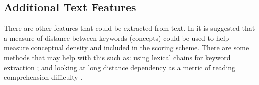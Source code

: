 \documentclass[12pt]{article}
\theoremstyle{grammarstyle}
\begin{document}


\subsection{Additional Text Features}
There are other features that could be extracted from text.
In \citep{robins2010learning} it is suggested that a measure of distance between keywords (concepts) could be used to help measure conceptual density and included in the scoring scheme. There are some methods that may help with this such as: using lexical chains for keyword extraction \citep{ercan2007using}; and looking at long distance dependency as a metric of reading comprehension difficulty \citep{liu2008dependency}. 
\end{document}
